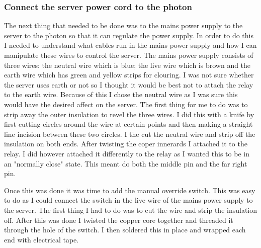 \documentclass{article}
\begin{document}
\subsubsection{Connect the server power cord to the photon}
The next thing that needed to be done was to the mains power supply to the server to the photon
so that it can regulate the power supply. In order to do this I needed to understand what cables
run in the mains power supply and how I can manipulate these wires to control the server. The mains
power supply consists of three wires: the neutral wire which is blue; the live wire which is brown
and the earth wire which has green and yellow strips for clouring. I was not sure whether the
server uses earth or not so I thought it would be best not to attach the relay to the earth wire. Because
of this I chose the neutral wire as I was sure this would have the desired affect on the server.
The first thing for me to do was to strip away the outer insulation to revel the three wires. I did this
with a knife by first cutting circles around the wire at certain points and then making a straight
line incision between these two circles. I the cut the neutral wire and strip off the insulation on
both ends. After twisting the coper innerards I attached it to the relay. I did however attached it
differently to the relay as I wanted this to be in an "normally close" state. This meant do both
the middle pin and the far right pin.

Once this was done it was time to add the manual override switch. This was easy to do as I could connect
the switch in the live wire of the mains power supply to the server. The first thing I had to do was
to cut the wire and strip the insulation off. After this was done I twisted the copper core together and
threaded it through the hole of the switch. I then soldered this in place and wrapped each end with
electrical tape.
\end{document}

